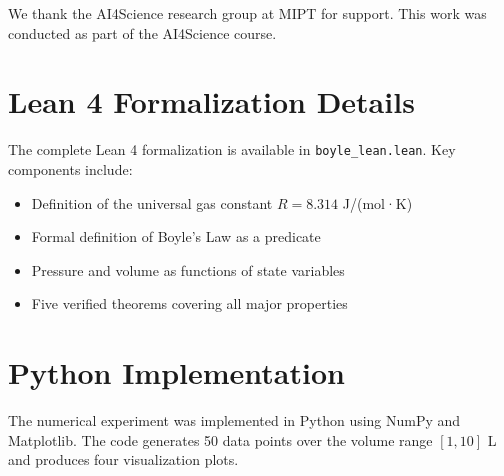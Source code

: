 \documentclass{article}
\theoremstyle{plain}
\theoremstyle{definition}
\theoremstyle{remark}
\begin{document}
We thank the AI4Science research group at MIPT for support. This work was conducted as part of the AI4Science course.




\newpage
\appendix
\onecolumn
\section{Lean 4 Formalization Details}

The complete Lean 4 formalization is available in \texttt{boyle\_lean.lean}. Key components include:

\begin{itemize}
  \item Definition of the universal gas constant $R = 8.314$ J/(mol·K)
  \item Formal definition of Boyle's Law as a predicate
  \item Pressure and volume as functions of state variables
  \item Five verified theorems covering all major properties
\end{itemize}

\section{Python Implementation}

The numerical experiment was implemented in Python using NumPy and Matplotlib. The code generates 50 data points over the volume range $[1, 10]$ L and produces four visualization plots.
\end{document}
